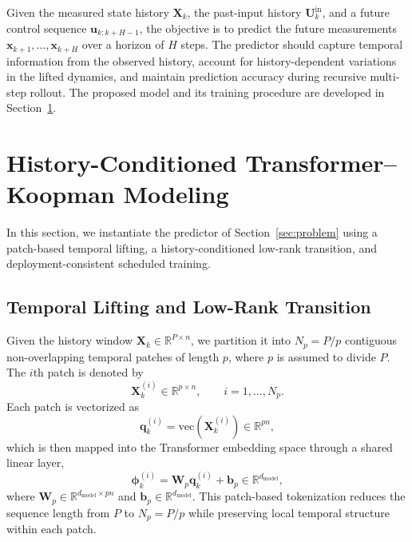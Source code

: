 \documentclass[journal]{IEEEtran}
\newcommand{\vx}{\mathbf{x}}
\newcommand{\vu}{\mathbf{u}}
\newcommand{\vb}{\mathbf{b}}
\newcommand{\vphi}{\boldsymbol{\phi}}
\newcommand{\vq}{\mathbf{q}}
\newcommand{\mW}{\mathbf{W}}
\newcommand{\mX}{\mathbf{X}}
\newcommand{\mU}{\mathbf{U}}
\begin{document}
Given the measured state history $\mX_k$, the past-input history $\mU_k^{\mathrm{in}}$, and a future control sequence $\vu_{k:k+H-1}$, the objective is to predict the future measurements $\vx_{k+1},\ldots,\vx_{k+H}$ over a horizon of $H$ steps. The predictor should capture temporal information from the observed history, account for history-dependent variations in the lifted dynamics, and maintain prediction accuracy during recursive multi-step rollout. The proposed model and its training procedure are developed in Section~\ref{sec:methodology}.

\section{History-Conditioned Transformer--Koopman Modeling}
\label{sec:methodology}

In this section, we instantiate the predictor of Section~\ref{sec:problem} using a patch-based temporal lifting, a history-conditioned low-rank transition, and deployment-consistent scheduled training.

\subsection{Temporal Lifting and Low-Rank Transition}
\label{sec:temporal_lifting}

Given the history window $\mX_k \in \mathbb{R}^{P \times n}$, we partition it into $N_p = P/p$ contiguous non-overlapping temporal patches of length $p$, where $p$ is assumed to divide $P$. The $i$th patch is denoted by
\begin{equation}
    \mX_k^{(i)} \in \mathbb{R}^{p \times n}, \qquad i=1,\ldots,N_p.
\end{equation}
Each patch is vectorized as
\begin{equation}
    \vq_k^{(i)} = \mathrm{vec}(\mX_k^{(i)}) \in \mathbb{R}^{pn},
    \label{eq:patch_vec}
\end{equation}
which is then mapped into the Transformer embedding space through a shared linear layer,
\begin{equation}
    \vphi_k^{(i)} = \mW_p \vq_k^{(i)} + \vb_p
    \in \mathbb{R}^{d_{\mathrm{model}}},
    \label{eq:patch_embedding}
\end{equation}
where $\mW_p \in \mathbb{R}^{d_{\mathrm{model}} \times pn}$ and
$\vb_p \in \mathbb{R}^{d_{\mathrm{model}}}$. This patch-based tokenization reduces the sequence length from $P$ to $N_p=P/p$ while preserving local temporal structure within each patch.
\end{document}
